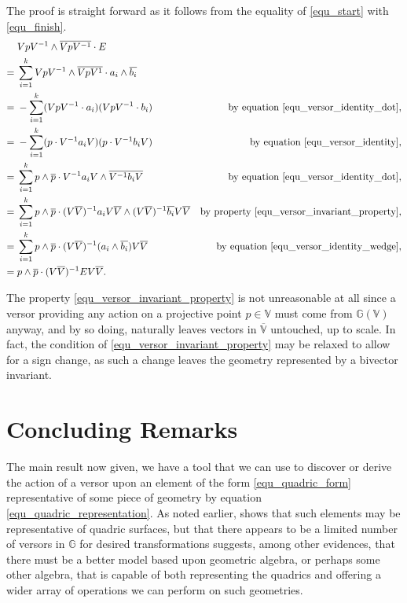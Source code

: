 \documentclass{birkjour}
\theoremstyle{definition}
\theoremstyle{remark}
\numberwithin{equation}{section}
\newcommand{\G}{\mathbb{G}}
\newcommand{\V}{\mathbb{V}}
\begin{document}
The proof is straight forward as it follows from the equality of \eqref{equ_start} with \eqref{equ_finish}.
\begin{align}
 & VpV^{-1}\wedge\overline{VpV^{-1}}\cdot E\label{equ_start} \\
=\;& \sum_{i=1}^k VpV^{-1}\wedge\overline{VpV^{1}}\cdot a_i\wedge\overline{b_i} \\
=\;& -\sum_{i=1}^k (VpV^{-1}\cdot a_i)(VpV^{-1}\cdot b_i) & \mbox{by equation \eqref{equ_versor_identity_dot},} \\
=\;& -\sum_{i=1}^k (p\cdot V^{-1}a_iV)(p\cdot V^{-1}b_iV) & \mbox{by equation \eqref{equ_versor_identity},} \\
=\;& \sum_{i=1}^k p\wedge\overline{p}\cdot V^{-1}a_iV\wedge\overline{V^{-1}b_iV} &\mbox{by equation \eqref{equ_versor_identity_dot},} \\
=\;& \sum_{i=1}^k p\wedge\overline{p}\cdot (V\overline{V})^{-1}a_iV\overline{V}\wedge
(V\overline{V})^{-1}\overline{b_i}V\overline{V} &\mbox{by property \eqref{equ_versor_invariant_property},} \\
=\;& \sum_{i=1}^k p\wedge\overline{p}\cdot (V\overline{V})^{-1}(a_i\wedge\overline{b_i})V\overline{V} & \mbox{by equation \eqref{equ_versor_identity_wedge},} \\
=\;& p\wedge\overline{p}\cdot (V\overline{V})^{-1}EV\overline{V}.\label{equ_finish}
\end{align}

The property \eqref{equ_versor_invariant_property} is not unreasonable at all
since a versor providing any action on a projective point $p\in\V$ must come from $\G(\V)$ anyway,
and by so doing, naturally leaves vectors in $\overline{\V}$ untouched, up to scale.
In fact, the condition of \eqref{equ_versor_invariant_property} may be relaxed to allow
for a sign change, as such a change leaves the geometry represented by a bivector invariant.

\section{Concluding Remarks}

The main result now given, we have a tool that we can use to discover or derive the
action of a versor upon an element of the form \eqref{equ_quadric_form} representative of some piece of geometry
by equation \eqref{equ_quadric_representation}.  As noted earlier, \cite{Parkin12} shows that such elements may
be representative of quadric surfaces, but that there appears to be a limited number of
versors in $\G$ for desired transformations suggests, among other evidences, that there must
be a better model based upon geometric algebra, or perhaps some other algebra, that is capable of both representing the
quadrics and offering a wider array of operations we  can perform on such geometries.
\end{document}
